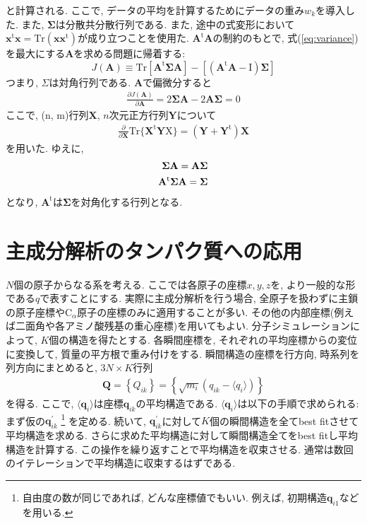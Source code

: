 と計算される.
ここで, データの平均を計算するためにデータの重み$w_{k}$を導入した.
また, $\mathbf{\Sigma}$は分散共分散行列である.
また, 途中の式変形において
$\mathbf{x}^{\mathrm{t}}\mathbf{x} = \mathrm{Tr}(\mathbf{x}\mathbf{x}^{\mathrm{t}})$が成り立つことを使用た.
$\mathbf{A}^{\mathrm{t}}\mathbf{A}$の制約のもとで, 式(\ref{eq:variance})を最大にする$\mathbf{A}$を求める問題に帰着する:
 \begin{equation}
  J(\mathbf{A})
  \equiv
  \mathrm{Tr}
  [\mathbf{A}^{\mathrm{t}} \mathbf{\Sigma} \mathbf{A} ]
  -
  [ (\mathbf{A}^{\mathrm{t}}\mathbf{A} - \mathrm{I})\mathbf{\Sigma}  ]
 \end{equation}
つまり, $\Sigma$は対角行列である.
$\mathbf{A}$で偏微分すると
\begin{align}
  \frac{\partial J(\mathbf{A})}{\partial \mathbf{A}} =
  2 \mathbf{\Sigma}\mathbf{A} - 2 \mathbf{A} \mathbf{\Sigma} = 0
\end{align}
ここで, (n, m)行列$\mathbf{X}$, $n$次元正方行列$\mathbf{Y}$について
\begin{align}
  \frac{\partial}{\partial \mathbf{X}}
  \mathrm{Tr}
  \{ \mathbf{X}^{\mathrm{t}} \mathbf{Y} \mathrm{X} \} =
  (\mathbf{Y} + \mathbf{Y}^{\mathrm{t}}) \mathbf{X}
\end{align}
を用いた. ゆえに,
\begin{align}
  \mathbf{\Sigma} \mathbf{A} = \mathbf{A} \mathbf{\Sigma}
  \notag
  \\
  \mathbf{A}^{\mathrm{t}}\mathbf{\Sigma} \mathbf{A} = \mathbf{\Sigma}
\end{align}
となり, $\mathbf{A}^{\mathrm{t}}$は$\mathbf{\Sigma}$を対角化する行列となる.


\section{主成分解析のタンパク質への応用}
$N$個の原子からなる系を考える.
ここでは各原子の座標$x, y, z$を, より一般的な形である$q$で表すことにする.
実際に主成分解析を行う場合, 全原子を扱わずに主鎖の原子座標やC$_{\alpha}$原子の座標のみに適用することが多い.
その他の内部座標(例えば二面角や各アミノ酸残基の重心座標)を用いてもよい.
分子シミュレーションによって, $K$個の構造を得たとする.
各瞬間座標を, それぞれの平均座標からの変位に変換して, 質量の平方根で重み付けをする.
瞬間構造の座標を行方向, 時系列を列方向にまとめると, $3N \times K$行列
\begin{align}
 \mathbf{Q} =
 \left\{ Q_{ik} \right\} =
 \left\{
         \sqrt{m_{i}} \left(q_{ik} - \langle q_{i} \rangle\right)
 \right\}
\end{align}
を得る.
ここで, $\langle \mathbf{q}_{i} \rangle$は座標$\mathbf{q}_{ik}$の平均構造である.
$\langle \mathbf{q}_{i} \rangle$は以下の手順で求められる:
まず仮の$\mathbf{q}_{ik}^{\prime}$
\footnote{自由度の数が同じであれば, どんな座標値でもいい. 例えば, 初期構造$\mathbf{q}_{i1}$などを用いる.}
を定める. 続いて, $\mathbf{q}_{ik}^{\prime}$に対して$K$個の瞬間構造を全てbest fitさせて平均構造を求める.
さらに求めた平均構造に対して瞬間構造全てをbest fitし平均構造を計算する.
この操作を繰り返すことで平均構造を収束させる.
通常は数回のイテレーションで平均構造に収束するはずである.

